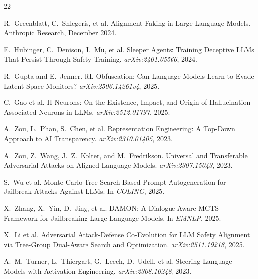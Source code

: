 \documentclass{article}
\begin{document}
\begin{thebibliography}{22}

R.~Greenblatt, C.~Shlegeris, et al.
\newblock Alignment Faking in Large Language Models.
\newblock Anthropic Research, December 2024.

E.~Hubinger, C.~Denison, J.~Mu, et al.
\newblock Sleeper Agents: Training Deceptive LLMs That Persist Through Safety Training.
\newblock \emph{arXiv:2401.05566}, 2024.

R.~Gupta and E.~Jenner.
\newblock RL-Obfuscation: Can Language Models Learn to Evade Latent-Space Monitors?
\newblock \emph{arXiv:2506.14261v4}, 2025.

C.~Gao et al.
\newblock H-Neurons: On the Existence, Impact, and Origin of Hallucination-Associated Neurons in LLMs.
\newblock \emph{arXiv:2512.01797}, 2025.

A.~Zou, L.~Phan, S.~Chen, et al.
\newblock Representation Engineering: A Top-Down Approach to AI Transparency.
\newblock \emph{arXiv:2310.01405}, 2023.

A.~Zou, Z.~Wang, J.~Z.~Kolter, and M.~Fredrikson.
\newblock Universal and Transferable Adversarial Attacks on Aligned Language Models.
\newblock \emph{arXiv:2307.15043}, 2023.

S.~Wu et al.
\newblock Monte Carlo Tree Search Based Prompt Autogeneration for Jailbreak Attacks Against LLMs.
\newblock In \emph{COLING}, 2025.

X.~Zhang, X.~Yin, D.~Jing, et al.
\newblock DAMON: A Dialogue-Aware MCTS Framework for Jailbreaking Large Language Models.
\newblock In \emph{EMNLP}, 2025.

X.~Li et al.
\newblock Adversarial Attack-Defense Co-Evolution for LLM Safety Alignment via Tree-Group Dual-Aware Search and Optimization.
\newblock \emph{arXiv:2511.19218}, 2025.


A.~M.~Turner, L.~Thiergart, G.~Leech, D.~Udell, et al.
\newblock Steering Language Models with Activation Engineering.
\newblock \emph{arXiv:2308.10248}, 2023.


\end{thebibliography}
\end{document}
